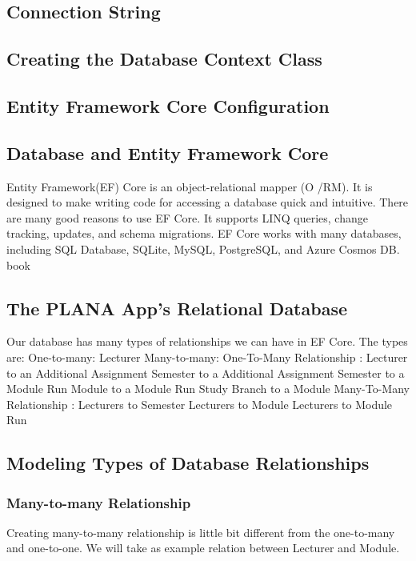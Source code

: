 \documentclass{scrartcl}
\begin{document}
\subsection{Connection String}

\subsection{Creating the Database Context Class}

\subsection{Entity Framework Core Configuration}

\subsection{Database and Entity Framework Core}
Entity Framework(EF) Core is an object-relational mapper (O /RM). It is designed to make writing code for accessing a database quick and intuitive.
There are many good reasons to use EF Core. It supports LINQ queries, change tracking, updates, and schema migrations. EF Core works with many databases, including SQL Database, SQLite, MySQL, PostgreSQL, and Azure Cosmos DB.
book \cite{efa} \cite{ef}

\subsection{The PLANA App's Relational Database}
Our database has many types of relationships we can have in EF Core. The types are:
One-to-many: Lecturer
Many-to-many:
One-To-Many Relationship : 
Lecturer to an Additional Assignment 
Semester to a Additional Assignment
Semester to a Module Run 
Module to a Module Run
Study Branch to a Module
Many-To-Many Relationship :
Lecturers to Semester
Lecturers to Module
Lecturers to Module Run




\subsection{Modeling Types of Database Relationships}
\subsubsection{Many-to-many Relationship }
Creating many-to-many relationship is little bit different from the one-to-many and one-to-one.
We will take as example relation between Lecturer and Module.\\
\end{document}
